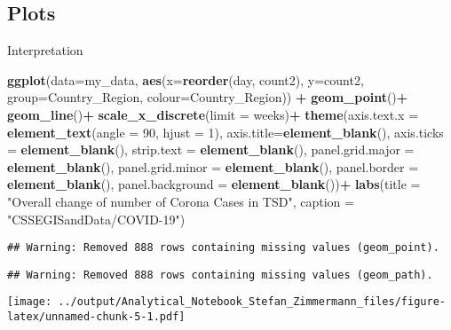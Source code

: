 \documentclass[]{article}
\newenvironment{Shaded}{\begin{snugshade}}{\end{snugshade}}
\newcommand{\DataTypeTok}[1]{\textcolor[rgb]{0.13,0.29,0.53}{#1}}
\newcommand{\DecValTok}[1]{\textcolor[rgb]{0.00,0.00,0.81}{#1}}
\newcommand{\KeywordTok}[1]{\textcolor[rgb]{0.13,0.29,0.53}{\textbf{#1}}}
\newcommand{\NormalTok}[1]{#1}
\newcommand{\OperatorTok}[1]{\textcolor[rgb]{0.81,0.36,0.00}{\textbf{#1}}}
\newcommand{\StringTok}[1]{\textcolor[rgb]{0.31,0.60,0.02}{#1}}
\begin{document}
\hypertarget{plots}{%
\subsection{Plots}\label{plots}}

Interpretation

\begin{Shaded}
\begin{Highlighting}[]
\KeywordTok{ggplot}\NormalTok{(}\DataTypeTok{data=}\NormalTok{my_data, }\KeywordTok{aes}\NormalTok{(}\DataTypeTok{x=}\KeywordTok{reorder}\NormalTok{(day, count2), }\DataTypeTok{y=}\NormalTok{count2, }\DataTypeTok{group=}\NormalTok{Country_Region, }\DataTypeTok{colour=}\NormalTok{Country_Region)) }\OperatorTok{+}
\StringTok{  }\KeywordTok{geom_point}\NormalTok{()}\OperatorTok{+}
\StringTok{  }\KeywordTok{geom_line}\NormalTok{()}\OperatorTok{+}
\StringTok{  }\KeywordTok{scale_x_discrete}\NormalTok{(}\DataTypeTok{limit =}\NormalTok{ weeks)}\OperatorTok{+}
\StringTok{  }\KeywordTok{theme}\NormalTok{(}\DataTypeTok{axis.text.x =} \KeywordTok{element_text}\NormalTok{(}\DataTypeTok{angle =} \DecValTok{90}\NormalTok{, }\DataTypeTok{hjust =} \DecValTok{1}\NormalTok{),}
        \DataTypeTok{axis.title=}\KeywordTok{element_blank}\NormalTok{(),}
        \DataTypeTok{axis.ticks =} \KeywordTok{element_blank}\NormalTok{(),}
        \DataTypeTok{strip.text =} \KeywordTok{element_blank}\NormalTok{(),}
        \DataTypeTok{panel.grid.major =} \KeywordTok{element_blank}\NormalTok{(), }
        \DataTypeTok{panel.grid.minor =} \KeywordTok{element_blank}\NormalTok{(), }
        \DataTypeTok{panel.border =} \KeywordTok{element_blank}\NormalTok{(), }
        \DataTypeTok{panel.background =} \KeywordTok{element_blank}\NormalTok{())}\OperatorTok{+}
\StringTok{ }\KeywordTok{labs}\NormalTok{(}\DataTypeTok{title =}  \StringTok{"Overall change of number of Corona Cases in TSD"}\NormalTok{,}
       \DataTypeTok{caption =} \StringTok{"CSSEGISandData/COVID-19"}\NormalTok{)}
\end{Highlighting}
\end{Shaded}

\begin{verbatim}
## Warning: Removed 888 rows containing missing values (geom_point).
\end{verbatim}

\begin{verbatim}
## Warning: Removed 888 rows containing missing values (geom_path).
\end{verbatim}

\texttt{[image: ../output/Analytical\_Notebook\_Stefan\_Zimmermann\_files/figure-latex/unnamed-chunk-5-1.pdf]}
\end{document}
